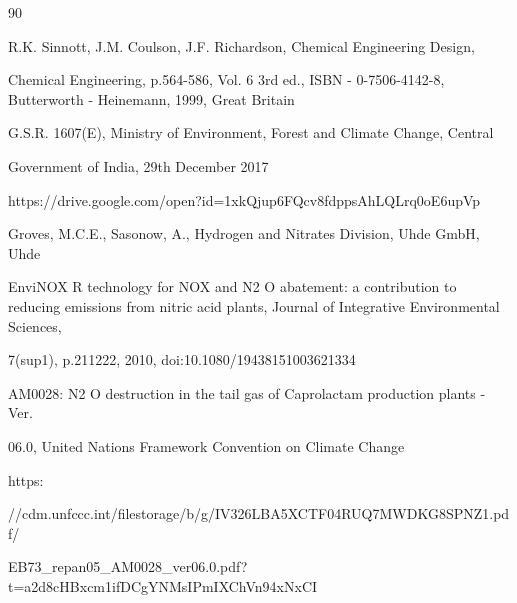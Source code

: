 \documentclass[a4paper,portrait,12pt]{article}
\begin{document}
90





\begin{flushleft}
[18] R.K. Sinnott, J.M. Coulson, J.F. Richardson, Chemical Engineering Design,
\end{flushleft}


\begin{flushleft}
Chemical Engineering, p.564-586, Vol. 6 3rd ed., ISBN - 0-7506-4142-8, Butterworth - Heinemann, 1999, Great Britain
\end{flushleft}


\begin{flushleft}
[19] G.S.R. 1607(E), Ministry of Environment, Forest and Climate Change, Central
\end{flushleft}


\begin{flushleft}
Government of India, 29th December 2017
\end{flushleft}


\begin{flushleft}
https://drive.google.com/open?id=1xkQjup6FQcv8fdppsAhLQLrq0oE6upVp
\end{flushleft}


\begin{flushleft}
[20] Groves, M.C.E., Sasonow, A., Hydrogen and Nitrates Division, Uhde GmbH, Uhde
\end{flushleft}


\begin{flushleft}
EnviNOX R technology for NOX and N2 O abatement: a contribution to reducing emissions from nitric acid plants, Journal of Integrative Environmental Sciences,
\end{flushleft}


\begin{flushleft}
7(sup1), p.211222, 2010, doi:10.1080/19438151003621334
\end{flushleft}


\begin{flushleft}
[21] AM0028: N2 O destruction in the tail gas of Caprolactam production plants - Ver.
\end{flushleft}


\begin{flushleft}
06.0, United Nations Framework Convention on Climate Change
\end{flushleft}


\begin{flushleft}
https:
\end{flushleft}


\begin{flushleft}
//cdm.unfccc.int/filestorage/b/g/IV326LBA5XCTF04RUQ7MWDKG8SPNZ1.pdf/
\end{flushleft}


\begin{flushleft}
EB73\_repan05\_AM0028\_ver06.0.pdf?t=a2d8cHBxcm1ifDCgYNMsIPmIXChVn94xNxCI
\end{flushleft}





\newpage
\end{document}

